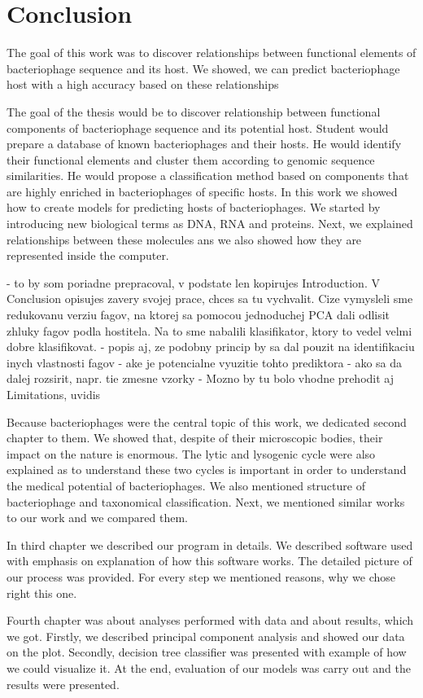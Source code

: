 \chapter*{Conclusion} %

The goal of this work was to discover relationships between functional elements of bacteriophage sequence and its host. 
We showed, we can predict bacteriophage host with a high accuracy based on these relationships


The goal of the thesis would be to discover relationship between functional
components of bacteriophage sequence and its potential host. Student would
prepare a database of known bacteriophages and their hosts. He would identify
their functional elements and cluster them according to genomic sequence
similarities. He would propose a classification method based on components
that are highly enriched in bacteriophages of specific hosts.
In this work we showed how to create models for predicting hosts of bacteriophages.
We started by introducing new biological terms as DNA, RNA and proteins.
Next, we explained relationships between these molecules ans we also showed how they are represented inside the computer.

- to by som poriadne prepracoval, v podstate len kopirujes Introduction. V Conclusion opisujes zavery svojej prace, chces sa tu vychvalit. Cize vymysleli sme redukovanu verziu fagov, na ktorej sa pomocou jednoduchej PCA dali odlisit zhluky fagov podla hostitela. Na to sme nabalili klasifikator, ktory to vedel velmi dobre klasifikovat.
- popis aj, ze podobny princip by sa dal pouzit na identifikaciu inych vlastnosti fagov
- ake je potencialne vyuzitie tohto prediktora
- ako sa da dalej rozsirit, napr. tie zmesne vzorky
- Mozno by tu bolo vhodne prehodit aj Limitations, uvidis

Because bacteriophages were the central topic of this work, we dedicated second chapter to them.
We showed that, despite of their microscopic bodies, their impact on the nature is enormous.
The lytic and lysogenic cycle were also explained as to understand these two cycles is important in order to understand the medical potential of bacteriophages.
We also mentioned structure of bacteriophage and taxonomical classification.
Next, we mentioned similar works to our work and we compared them.

In third chapter we described our program in details.
We described software used with emphasis on explanation of how this software works.
The detailed picture of our process was provided.
For every step we mentioned reasons, why we chose right this one.

Fourth chapter was about analyses performed with data and about results, which we got.
Firstly, we described principal component analysis and showed our data on the plot.
Secondly, decision tree classifier was presented with example of how we could visualize it.
At the end, evaluation of our models was carry out and the results were presented.